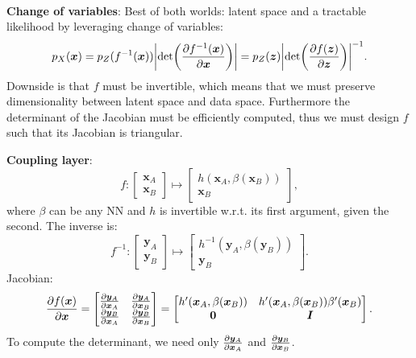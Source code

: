 \documentclass{article}
\newcommand{\lft}{\mathopen{}\mathclose\bgroup\left}
\newcommand{\rgt}{\aftergroup\egroup\right}
\renewcommand{\vec}[1]{\bm{#1}}
\newcommand{\mat}[1]{\bm{#1}}
\newenvironment{topic}[1]
{\textbf{\sffamily \colorbox{black}{\rlap{\textbf{\textcolor{white}{#1}}}\hspace{\linewidth}\hspace{-2\fboxsep}}} \\ \vspace{0.2cm}}
{}
\begin{document}
\begin{multicols*}{2}
\begin{topic}{Normalizing flow}
        \textbf{Change of variables}: Best of both worlds: latent space and a tractable likelihood by
        leveraging change of variables: \[
            p_X(\vec{x}) = p_Z(f^{-1}(\vec{x})) \lft| \det\lft( \pdv{f^{-1}(\vec{x})}{\vec{x}} \rgt) \rgt| = p_Z(\vec{z}) \lft| \det\lft( \pdv{f(\vec{z})}{\vec{z}} \rgt) \rgt|^{-1}.
        \]
        Downside is that $f$ must be invertible, which means that we must preserve dimensionality between
        latent space and data space. Furthermore the determinant of the Jacobian must be efficiently
        computed, thus we must design $f$ such that its Jacobian is triangular.

        \textbf{Coupling layer}: \[
            f: \begin{bmatrix}
                \vec{x}_A \\ \vec{x}_B
            \end{bmatrix}
            \mapsto
            \begin{bmatrix}
                h(\vec{x}_A, \beta(\vec{x}_B)) \\
                \vec{x}_B
            \end{bmatrix},
        \]
        where $\beta$ can be any NN and $h$ is invertible w.r.t. its first argument, given the second. The
        inverse is: \[
            f^{-1}: \begin{bmatrix}
                \vec{y}_A \\
                \vec{y}_B
            \end{bmatrix}
            \mapsto
            \begin{bmatrix}
                h^{-1}(\vec{y}_A, \beta(\vec{y}_B)) \\
                \vec{y}_B
            \end{bmatrix}.
        \]
        Jacobian: \[
            \pdv{f(\vec{x})}{\vec{x}} = \begin{bmatrix}
                \pdv{\vec{y}_A}{\vec{x}_A} & \pdv{\vec{y}_A}{\vec{x}_B} \\
                \pdv{\vec{y}_B}{\vec{x}_A} & \pdv{\vec{y}_B}{\vec{x}_B}
            \end{bmatrix}
            = \begin{bmatrix}
                h'(\vec{x}_A, \beta(\vec{x}_B)) & h'(\vec{x}_A, \beta(\vec{x}_B)) \beta'(\vec{x}_B) \\
                \mat{0}                         & \mat{I}
            \end{bmatrix}.
        \]
        To compute the determinant, we need only $\pdv{\vec{y}_A}{\vec{x}_A}$ and
        $\pdv{\vec{y}_B}{\vec{x}_B}$.


\end{topic}
\end{multicols*}
\end{document}
